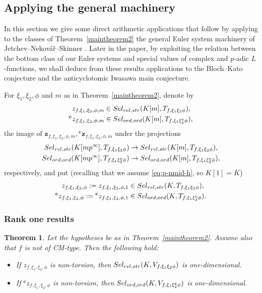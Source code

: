 \documentclass[10pt,letterpaper]{amsart}
\theoremstyle{plain}
\newtheorem{thm}{Theorem}[subsection] %
\theoremstyle{definition}
\theoremstyle{definition}
\theoremstyle{plain}
\theoremstyle{plain}
\theoremstyle{plain}
\theoremstyle{remark}
\numberwithin{equation}{section}
\newcommand{\cc}{\mathbf{c}}
\newcommand{\Sel}{Sel}
\newcommand{\relstr}{{{\rm rel},{\rm str}}}
\newcommand{\ord}{{{\rm ord},{\rm ord}}}
\def\Sel{{\rm Sel}}
\begin{document}
\subsection{Applying the general machinery} 

In this section we give some direct arithmetic applications that follow by applying to the classes of Theorem~\ref{maintheorem2}  the general Euler system machinery of Jetchev--Nekov\'a{\v r}--Skinner  \cite{JNS}. Later in the paper, by exploiting the relation between the bottom class of our Euler systems and special values of complex and $p$-adic $L$-functions, we shall deduce from these results applications to the Bloch--Kato conjecture and the anticyclotomic Iwasawa main conjecture.




For $\xi_1,\xi_2,\phi$ and $m$ as in Theorem~\ref{maintheorem2}, denote by
\begin{align*}
z_{f,\xi_1,\xi_2,\phi,m}&\in\Sel_{\relstr}(K[m],T_{f,\xi_1\xi_2\phi}),\\
{}^\cc z_{f,\xi_1,\xi_2,\phi,m}&\in\Sel_{\ord}(K[m],T_{f,\xi_1\xi_2^\cc\phi}),
\end{align*}
the image of $\mathbf{z}_{f,\xi_1,\xi_2,\phi,m}, {}^\cc\mathbf{z}_{f,\xi_1,\xi_2,\phi,m}$ under the projections
\begin{align*}
\Sel_{\relstr}(K[mp^\infty],T_{f,\xi_1\xi_2\phi})&\rightarrow\Sel_{\relstr}(K[m],T_{f,\xi_1\xi_2\phi}),\\
\Sel_{\ord}(K[mp^\infty],T_{f,\xi_1\xi_2^\cc\phi})&\rightarrow\Sel_{\ord}(K[m],T_{f,\xi_1\xi_2^\cc\phi}),
\end{align*}
respectively, and put (recalling that we assume \eqref{eq:p-nmid-h}, so $K[1]=K$)
\begin{align*}
z_{f,\xi_1,\xi_2,\phi}:=z_{f,\xi_1,\xi_2,\phi,1}&\in\Sel_{\relstr}(K,T_{f,\xi_1\xi_2\phi}),\\
{}^\cc z_{f,\xi_1,\xi_2,\phi}:=
{}^\cc z_{f,\xi_1,\xi_2,\phi,1}&\in\Sel_{\ord}(K,T_{f,\xi_1\xi_2^\cc\phi}).
\end{align*}


\subsubsection{Rank one results}

\begin{thm}\label{thm:rank-1-general}
Let the hypotheses be as in Theorem~\ref{maintheorem2}. Assume also that $f$ is not of CM-type. Then the following hold:
\begin{itemize}
\item[(I)] If $z_{f,\xi_1,\xi_2,\phi}$ is non-torsion, then $\Sel_{\relstr}(K,V_{f,\xi_1\xi_2\phi})$ is one-dimensional.
\item[(II)] If ${}^\cc z_{f,\xi_1,\xi_2,\phi}$ is non-torsion, then $\Sel_{\ord}(K,V_{f,\xi_1\xi_2^\cc\phi})$ is one-dimensional.
\end{itemize}
\end{thm}
\end{document}
